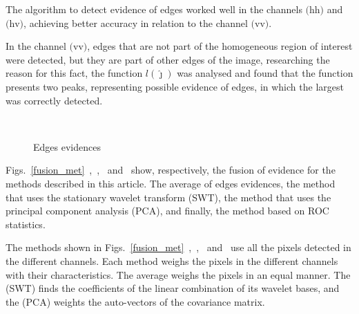 \documentclass[conference]{IEEEtran}
\begin{document}
The algorithm to detect evidence of edges worked well in the channels $\text{(hh)}$ and $\text{(hv)}$, achieving better accuracy in relation to the channel $\text{(vv)}$.  

In the channel $\text{(vv)}$, edges that are not part of the homogeneous region of interest were detected, but they are part of other edges of the image, researching the reason for this fact, the function $l(\widehat\jmath)$ was analysed and found that the function presents two peaks, representing possible evidence of edges, in which the largest was correctly detected. 
   \begin{figure}[!ht]
     \hfill
     \\
     \centering
     \caption{Edges evidences}
     \label{evidencias_hh_hv_vv}
   \end{figure}

Figs.~\ref{fusion_met}~,~,~ and~ show, respectively, the fusion of evidence for the methods described in this article. The average of edges evidences, the method that uses the stationary wavelet transform (SWT), the method that uses the principal component analysis (PCA), and finally, the method based on ROC statistics.

The methods shown in Figs.~\ref{fusion_met}~,~,~ and~ use all the pixels detected in the different channels. Each method weighs the pixels in the different channels with their characteristics. The average weighs the pixels in an equal manner. The (SWT) finds the coefficients of the linear combination of its wavelet bases, and the (PCA) weights the auto-vectors of the covariance matrix.
\end{document}
